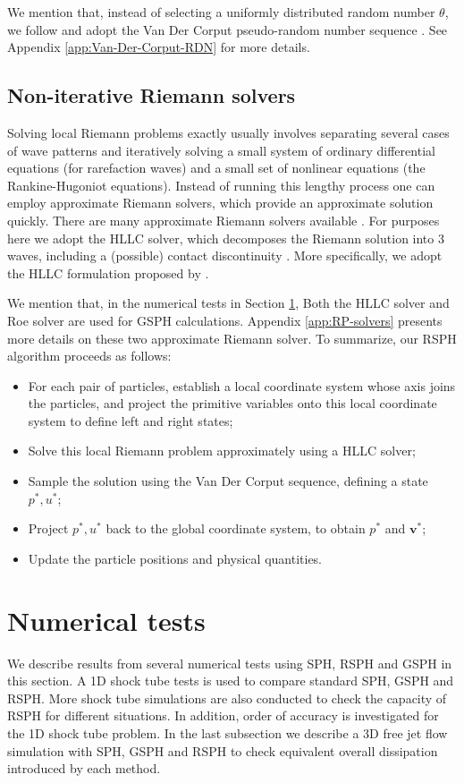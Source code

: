 We mention that, instead of selecting a uniformly distributed random number $\theta$, we follow \citet{colella1982glimm} and adopt the Van Der Corput pseudo-random number sequence \citep{hammersley2013monte}. See Appendix \ref{app:Van-Der-Corput-RDN} for more details.

\subsection{Non-iterative Riemann solvers} \label{sec:RP-solver}
Solving local Riemann problems exactly usually involves separating several cases of wave patterns and iteratively solving a small system of ordinary differential equations (for rarefaction waves) and a small set of nonlinear equations (the Rankine-Hugoniot equations). Instead of running this lengthy process one can employ approximate Riemann solvers, which provide an approximate solution quickly. There are many approximate Riemann solvers available \citep{rider1994review, luo2004computation, puri2014approximate}. For purposes here we adopt the HLLC solver, which decomposes the Riemann solution into 3 waves, including a (possible) contact discontinuity \cite{toro1994restoration}. More specifically, we adopt the HLLC formulation proposed by \citet{luo2004computation}.
 
We mention that, in the numerical tests in Section \ref{numericaltests}, Both the HLLC solver and Roe solver are used for GSPH calculations. Appendix \ref{app:RP-solvers} presents more details on these two approximate Riemann solver.
To summarize, our RSPH algorithm proceeds as follows:
\begin{itemize}
\item For each pair of particles, establish a local coordinate system whose axis joins the particles,
and project the primitive variables onto this local coordinate system to define left and right states;
\item Solve this local Riemann problem approximately using a HLLC solver;
\item Sample the solution using the Van Der Corput sequence, defining a state  $p^{\ast}, u^{\ast}$;
\item Project $p^{\ast}, u^{\ast}$  back to the global coordinate system, to obtain $p^{\ast}$ and $\textbf{v}^{\ast}$;
\item Update the particle positions and physical quantities.
\end{itemize}

\section{Numerical tests} \label{numericaltests}
We describe results from several numerical tests using SPH, RSPH and GSPH in this section.
A 1D shock tube tests is used to compare standard SPH, GSPH and RSPH. More shock tube simulations are also conducted to check the capacity of RSPH for different situations. In addition, order of accuracy is investigated for the 1D shock tube problem. In the last subsection we describe a 3D free jet flow simulation with SPH, GSPH and RSPH to check equivalent overall dissipation introduced by each method.

